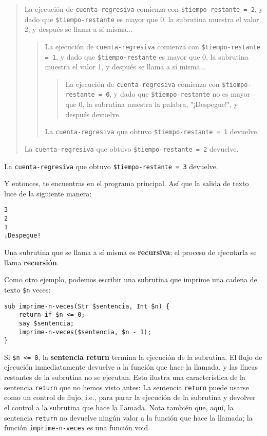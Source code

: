 \begin{quote}
La ejecución de {\tt cuenta-regresiva} comienza con 
{\tt \$tiempo-restante = 2}, y dado que {\tt \$tiempo-restante}
es mayor que 0, la subrutina muestra el valor 2, y después
se llama a sí misma...

\begin{quote}
La ejecución de {\tt cuenta-regresiva} comienza con 
{\tt \$tiempo-restante = 1}, y dado que {\tt \$tiempo-restante}
es mayor que 0, la subrutina muestra el valor 1, y después
se llama a sí misma...

\begin{quote}
La ejecución de {\tt cuenta-regresiva} comienza con 
{\tt \$tiempo-restante = 0}, y dado que {\tt \$tiempo-restante}
no es mayor que 0, la subrutina muestra la palabra, "¡Despegue!",
y después devuelve.
\end{quote}

La {\tt cuenta-regresiva} que obtuvo {\tt \$tiempo-restante = 1} devuelve.
\end{quote}


La {\tt cuenta-regresiva} que obtuvo {\tt \$tiempo-restante = 2} devuelve.
\end{quote}


La {\tt cuenta-regresiva} que obtuvo {\tt \$tiempo-restante = 3} devuelve.

Y entonces, te encuentras en el programa principal. Así que la
salida de texto luce de la siguiente manera:

\begin{verbatim}
3
2
1
¡Despegue!
\end{verbatim}
%
Una subrutina que se llama a sí misma es {\bf recursiva};
el proceso de ejecutarla se llama {\bf recursión}.

Como otro ejemplo, podemos escribir una subrutina que 
imprime una cadena de texto {\tt \$n} veces:

\begin{verbatim}
sub imprime-n-veces(Str $sentencia, Int $n) {
    return if $n <= 0;
    say $sentencia;
    imprime-n-veces($sentencia, $n - 1);
}
\end{verbatim}
%
Si {\tt \$n <= 0}, la {\bf sentencia return} termina la ejecución 
de la subrutina. El flujo de ejecución inmediatamente devuelve
a la función que hace la llamada, y las líneas restantes de la
subrutina no se ejecutan. Esto ilustra una característica de la 
sentencia {\tt return} que no hemos visto antes: La sentencia
{\tt return} puede usarse como un control de flujo, i.e., para 
parar la ejecución de la subrutina y devolver el control
a la subrutina que hace la llamada. Nota también que, aquí,
la sentencia {\tt return} no devuelve ningún valor a la función
que hace la llamada; la función {\tt imprime-n-veces} es una
función void.


